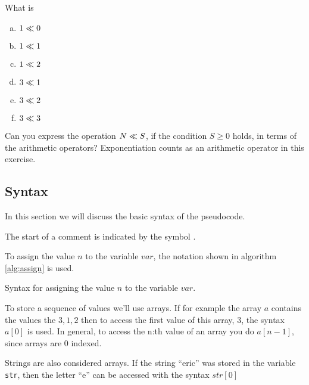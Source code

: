 \begin{Exercise}[label={bit-equiv}]

  What is

  \begin{enumerate}[(a)]
  \item $1 \ll 0$
  \item $1 \ll 1$
  \item $1 \ll 2$
  \item $3 \ll 1$
  \item $3 \ll 2$
  \item $3 \ll 3$
  \end{enumerate}

  Can you express the operation $N \ll S$, if the condition $S
  \geq 0$ holds, in terms of the arithmetic operators? Exponentiation
  counts as an arithmetic operator in this exercise.

\end{Exercise}

\begin{Exercise}[]

\end{Exercise}


\subsection{Syntax}

In this section we will discuss the basic syntax of the pseudocode.

The start of a comment is indicated by the symbol \commentsymbol.

To assign the value $n$ to the variable $var$, the notation shown in
algorithm \ref{alg:assign} is used.



\begin{algorithm}[H]
  \caption{Syntax for assigning the value $n$ to the variable $var$.}
  \label{alg:assign}
  \begin{algorithmic}[1]
  \end{algorithmic}
\end{algorithm}

To store a sequence of values we'll use arrays. If for example the
array $a$ contains the values the $3,1,2$ then to access the first
value of this array, $3$, the syntax $a[0]$ is used. In general, to
access the n:th value of an array you do $a[n-1]$, since arrays are 0
indexed.

Strings are also considered arrays. If the string ``eric'' was
stored in the variable \texttt{str}, then the letter ``e'' can be
accessed with the syntax $str[0]$

